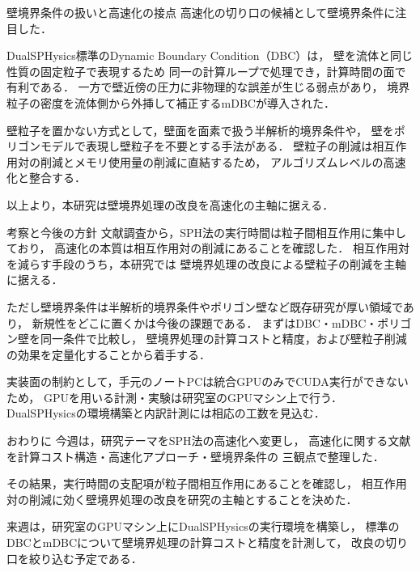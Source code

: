 \documentclass[aspectratio=169,11pt]{beamer}
\begin{document}
\begin{frame}{壁境界条件の扱いと高速化の接点}
  高速化の切り口の候補として壁境界条件に注目した．

  \vspace{0.8em}
  DualSPHysics標準のDynamic Boundary Condition（DBC）は，
  壁を流体と同じ性質の固定粒子で表現するため
  同一の計算ループで処理でき，計算時間の面で有利である\cite{crespo2007}．
  一方で壁近傍の圧力に非物理的な誤差が生じる弱点があり，
  境界粒子の密度を流体側から外挿して補正するmDBCが導入された\cite{english2021}．

  \vspace{0.8em}
  壁粒子を置かない方式として，壁面を面素で扱う半解析的境界条件\cite{ferrand2013}や，
  壁をポリゴンモデルで表現し壁粒子を不要とする手法\cite{harada2007wall}がある．
  壁粒子の削減は相互作用対の削減とメモリ使用量の削減に直結するため，
  アルゴリズムレベルの高速化と整合する．

  \vspace{0.8em}
  \alert{以上より，本研究は壁境界処理の改良を高速化の主軸に据える．}
\end{frame}

\begin{frame}{考察と今後の方針}
  文献調査から，SPH法の実行時間は粒子間相互作用に集中しており，
  高速化の本質は相互作用対の削減にあることを確認した．
  相互作用対を減らす手段のうち，本研究では
  \alert{壁境界処理の改良による壁粒子の削減}を主軸に据える．

  \vspace{0.8em}
  ただし壁境界条件は半解析的境界条件やポリゴン壁など既存研究が厚い領域であり，
  新規性をどこに置くかは今後の課題である．
  まずはDBC・mDBC・ポリゴン壁を同一条件で比較し，
  壁境界処理の計算コストと精度，および壁粒子削減の効果を定量化することから着手する．

  \vspace{0.8em}
  実装面の制約として，手元のノートPCは統合GPUのみでCUDA実行ができないため，
  GPUを用いる計測・実験は研究室のGPUマシン上で行う．
  DualSPHysicsの環境構築と内訳計測には相応の工数を見込む．
\end{frame}

\begin{frame}{おわりに}
  今週は，研究テーマをSPH法の高速化へ変更し，
  高速化に関する文献を計算コスト構造・高速化アプローチ・壁境界条件の
  三観点で整理した．

  \vspace{1em}
  その結果，実行時間の支配項が粒子間相互作用にあることを確認し，
  相互作用対の削減に効く\alert{壁境界処理の改良}を研究の主軸とすることを決めた．

  \vspace{1em}
  来週は，研究室のGPUマシン上にDualSPHysicsの実行環境を構築し，
  標準のDBCとmDBCについて壁境界処理の計算コストと精度を計測して，
  改良の切り口を絞り込む予定である．
\end{frame}
\end{document}
